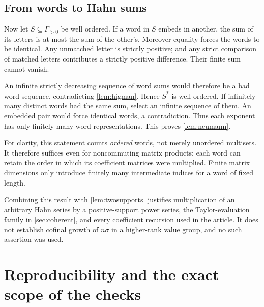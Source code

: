 \documentclass[11pt,letterpaper]{article}
\numberwithin{equation}{section}
\theoremstyle{definition}
\theoremstyle{remark}
\begin{document}
\subsection{From words to Hahn sums}
Now let $S\subseteq\Gamma_{>0}$ be well ordered. If a word in $S$ embeds
in another, the sum of its letters is at most the sum of the other's.
Moreover equality forces the words to be identical. Any unmatched letter
is strictly positive; and any strict comparison of matched letters
contributes a strictly positive difference. Their finite sum cannot vanish.

An infinite strictly decreasing sequence of word sums would therefore be
a bad word sequence, contradicting \cref{lem:higman}. Hence $S^*$ is
well ordered. If infinitely many distinct words had the same sum, select
an infinite sequence of them. An embedded pair would force identical words,
a contradiction. Thus each exponent has only finitely many word
representations. This proves \cref{lem:neumann}.

For clarity, this statement counts \emph{ordered} words, not merely
unordered multisets. It therefore suffices even for noncommuting matrix
products: each word can retain the order in which its coefficient matrices
were multiplied. Finite matrix dimensions only introduce finitely many
intermediate indices for a word of fixed length.

Combining this result with \cref{lem:twosupports} justifies multiplication
of an arbitrary Hahn series by a positive-support power series, the
Taylor-evaluation family in \cref{sec:coherent}, and every coefficient
recursion used in the article. It does not establish cofinal growth of
$n\sigma$ in a higher-rank value group, and no such assertion was used.

\section{Reproducibility and the exact scope of the checks}
\label{app:verification}
\end{document}
